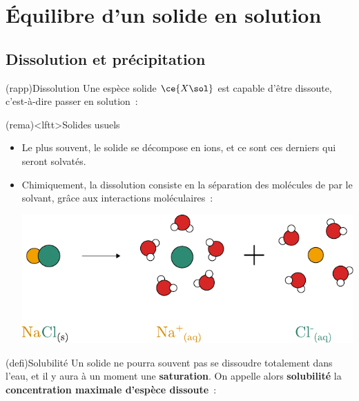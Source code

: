 \documentclass[../../main/main.tex]{subfiles}
\begin{document}
\section{Équilibre d'un solide en solution}

\subsection{Dissolution et précipitation}
\begin{tcb*}(rapp){Dissolution}
	Une espèce solide $\ce{X\sol}$ est capable d'être dissoute, c'est-à-dire passer
	en solution~:
	\psw{
	\[
		\ce{A_pB_q\sol{}} = p \ce{A+}\aqu{} + q \ce{B-}\aqu
	\]
	}
	\vspace{-15pt}
\end{tcb*}

\begin{tcb*}(rema)<lftt>{Solides usuels}
	\begin{itemize}
		\item Le plus souvent, le solide se décompose en ions, et ce sont ces
		      derniers qui seront solvatés.
		\item Chimiquement, la dissolution consiste en la séparation des molécules
		      de  par le solvant, grâce aux interactions moléculaires~:
		      \begin{center}
			      \includegraphics[scale=.8]{dissolution}
		      \end{center}
	\end{itemize}
\end{tcb*}

\begin{tcb*}[sidebyside, righthand ratio=.3](defi){Solubilité}
	Un solide ne pourra souvent pas se dissoudre totalement dans l'eau, et il y
	aura à un moment une \textbf{saturation}. On appelle alors \textbf{solubilité}
	la \textbf{concentration maximale d'espèce dissoute}~:
	\psw{
		\[
			\boxed{s = \frac{n\ind{dis,max}}{V}}
		\]
	}
	\vspace{-15pt}
	\tcblower
	\psw{
		\[
			\si{mol.L^{-1}}
		\]
	}
\end{tcb*}
\end{document}
